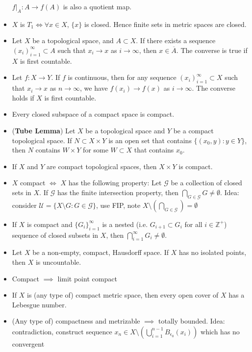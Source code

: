 \documentclass[frenchspacing,9pt,landscape,a4paper]{article}
\newcommand{\BZ}{\mathbb Z}
\theoremstyle{remark}
\begin{document}
\begin{multicols}{4}
\begin{itemize}
             $f|_A:A\to f(A)$ is also a quotient map.
         \item $X$ is  $T_1\iff\forall x\in X$, $\{x\}$ is closed. Hence finite sets in metric spaces are
    closed.
         \item Let $X$ be a topological space, and $A\subset X$. If there exists a sequence  $(x_i)_{i=1}^\infty\subset A$ such that
             $x_i\to x$ as  $i\to\infty$, then  $x\in\overline{A}$. The converse is true if  $X$ is first
             countable.
         \item Let  $f:X\to Y$. If  $f$ is continuous, then for any sequence  $(x_i)_{i=1}^\infty\subset X$
             such that  $x_i\to x$ as  $n\to\infty$, we have  $f(x_i)\to f(x)$ as  $i\to\infty$. The
             converse holds if  $X$ is first countable.
         \item Every closed subspace of a compact space is compact.
         \item (\textbf{Tube Lemma}) Let $X$ be a topological space and  $Y$ be a compact topological space. If  $N\subset X\times Y$ is an
    open set that contains  $\{(x_0,y):y\in Y\}$, then $N$ contains $W\times Y$ for some  $W\subset X$ that
    contains $x_0$.
\item If $X$ and  $Y$ are compact topological spaces, then  $X\times Y$ is compact.
\item $X$ compact $\iff$ $X$ has the following property: Let
    $\mathcal{G}$ be a collection of closed sets in  $X$. If  $\mathcal{G}$ has the finite intersection
    property, then  $\bigcap_{G\in\mathcal{G}} G\neq\emptyset$. Idea: consider $\mathcal{U}=\{X\setminus
    G:G\in\mathcal{G}\}$, use FIP, note  $X\setminus(\bigcap_{G\in\mathcal{G}})=\emptyset$
\item If $X$ is compact and  $\{G_i\}_{i=1}^\infty$ is a nested (i.e. $G_{i+1}\subset G_i$ for all
    $i\in\BZ^+$) sequence of closed subsets in $X$, then  $\bigcap_{i=1}^\infty G_i\neq\emptyset$.
\item Let $X$ be a non-empty, compact, Hausdorff space. If  $X$ has no isolated points, then  $X$ is
    uncountable.
\item Compact $\implies$ limit point compact
\item If $X$ is (any type of) compact metric space, then every open cover of $X$ has a Lebesgue number. 
\item (Any type of) compactness and metrizable $\implies$ totally bounded. Idea: contradiction, construct
    sequence  $x_n\in X\setminus(\bigcup_{i=1}^{n-1}B_{\epsilon_0}(x_i))$ which has no convergent

\end{itemize}
\end{multicols}
\end{document}
